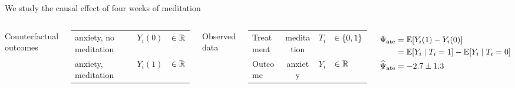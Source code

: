 \documentclass[aspectratio=169]{beamer}
\theoremstyle{remark}
\begin{document}
\begin{frame}{We study the causal effect of four weeks of meditation}

    \begin{columns}

        Counterfactual outcomes

        \begin{table}[]
            \begin{tabular}{lcl}
                anxiety, no meditation & $Y_i(0)$ & $\in \mathbb{R}$ \\
                anxiety, meditation    & $Y_i(1)$ & $\in \mathbb{R}$
            \end{tabular}
        \end{table}

        Observed data

        \begin{table}[]
            \begin{tabular}{lcrl}
                Treatment & meditation & $T_i$ & $\in \{0, 1\} $ \\
                Outcome   & anxiety    & $Y_i$ & $\in \mathbb{R}$
            \end{tabular}
        \end{table}
        \begin{align*}
            \ate    & = \E{Y_i (1) - Y_i (0)}                       \\
                    & = \E{Y_i \mid T_i = 1} - \E{Y_i \mid T_i = 0} \\
            \atehat & = -2.7 \pm 1.3
        \end{align*}


\end{columns}
\end{frame}
\end{document}
